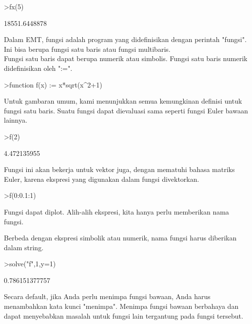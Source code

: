 \documentclass[a4paper,10pt]{article}
\begin{document}
\begin{eulernotebook}
\begin{eulercomment}
\begin{eulercomment}
\begin{eulercomment}
\begin{eulercomment}
\begin{euleroutput}
\end{euleroutput}
\begin{eulerprompt}
>fx(5)
\end{eulerprompt}
\begin{euleroutput}
  18551.6448878
\end{euleroutput}
\begin{eulercomment}
Dalam EMT, fungsi adalah program yang didefinisikan dengan perintah
"fungsi". Ini bisa berupa fungsi satu baris atau fungsi multibaris.\\
Fungsi satu baris dapat berupa numerik atau simbolis. Fungsi satu
baris numerik didefinisikan oleh ":=".
\end{eulercomment}
\begin{eulerprompt}
>function f(x) := x*sqrt(x^2+1)
\end{eulerprompt}
\begin{eulercomment}
Untuk gambaran umum, kami menunjukkan semua kemungkinan definisi untuk
fungsi satu baris. Suatu fungsi dapat dievaluasi sama seperti fungsi
Euler bawaan lainnya.
\end{eulercomment}
\begin{eulerprompt}
>f(2)
\end{eulerprompt}
\begin{euleroutput}
  4.472135955
\end{euleroutput}
\begin{eulercomment}
Fungsi ini akan bekerja untuk vektor juga, dengan mematuhi bahasa
matriks Euler, karena ekspresi yang digunakan dalam fungsi
divektorkan.
\end{eulercomment}
\begin{eulerprompt}
>f(0:0.1:1)
\end{eulerprompt}
\begin{euleroutput}
  [0,  0.100499,  0.203961,  0.313209,  0.430813,  0.559017,  0.699714,
  0.854459,  1.0245,  1.21083,  1.41421]
\end{euleroutput}
\begin{eulercomment}
Fungsi dapat diplot. Alih-alih ekspresi, kita hanya perlu memberikan
nama fungsi.

Berbeda dengan ekspresi simbolik atau numerik, nama fungsi harus
diberikan dalam string.
\end{eulercomment}
\begin{eulerprompt}
>solve("f",1,y=1)
\end{eulerprompt}
\begin{euleroutput}
  0.786151377757
\end{euleroutput}
\begin{eulercomment}
Secara default, jika Anda perlu menimpa fungsi bawaan, Anda harus
menambahkan kata kunci "menimpa". Menimpa fungsi bawaan berbahaya dan
dapat menyebabkan masalah untuk fungsi lain tergantung pada fungsi
tersebut.


\end{eulercomment}
\end{eulercomment}
\end{eulercomment}
\end{eulercomment}
\end{eulercomment}
\end{eulernotebook}
\end{document}
